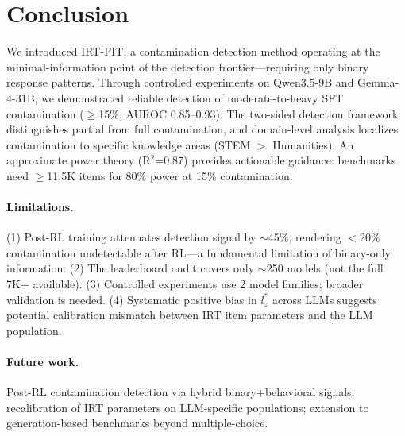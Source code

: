 \documentclass[11pt,a4paper]{article}
\begin{document}
\section{Conclusion}

We introduced IRT-FIT, a contamination detection method operating at the minimal-information point of the detection frontier---requiring only binary response patterns. Through controlled experiments on Qwen3.5-9B and Gemma-4-31B, we demonstrated reliable detection of moderate-to-heavy SFT contamination ($\geq$15\%, AUROC 0.85--0.93). The two-sided detection framework distinguishes partial from full contamination, and domain-level analysis localizes contamination to specific knowledge areas (STEM $>$ Humanities). An approximate power theory (R$^2$=0.87) provides actionable guidance: benchmarks need $\geq$11.5K items for 80\% power at 15\% contamination.

\paragraph{Limitations.} (1) Post-RL training attenuates detection signal by ${\sim}$45\%, rendering $<$20\% contamination undetectable after RL---a fundamental limitation of binary-only information. (2) The leaderboard audit covers only ${\sim}$250 models (not the full 7K+ available). (3) Controlled experiments use 2 model families; broader validation is needed. (4) Systematic positive bias in $l_z^*$ across LLMs suggests potential calibration mismatch between IRT item parameters and the LLM population.

\paragraph{Future work.} Post-RL contamination detection via hybrid binary+behavioral signals; recalibration of IRT parameters on LLM-specific populations; extension to generation-based benchmarks beyond multiple-choice.
\end{document}
